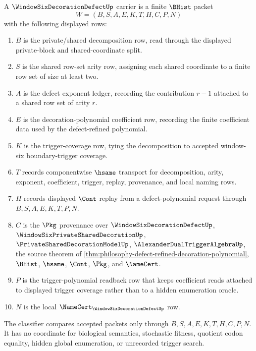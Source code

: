 \begin{definition}\label{def:window-six-decoration-defect-carrier}
A $\WindowSixDecorationDefectUp$ carrier is a finite $\BHist$ packet
$$
W=(B,S,A,E,K,T,H,C,P,N)
$$
with the following displayed rows:
\begin{enumerate}
\item $B$ is the private/shared decomposition row, read through the displayed private-block and shared-coordinate split.
\item $S$ is the shared row-set arity row, assigning each shared coordinate to a finite row set of size at least two.
\item $A$ is the defect exponent ledger, recording the contribution $r-1$ attached to a shared row set of arity $r$.
\item $E$ is the decoration-polynomial coefficient row, recording the finite coefficient data used by the defect-refined polynomial.
\item $K$ is the trigger-coverage row, tying the decomposition to accepted window-six boundary-trigger coverage.
\item $T$ records componentwise $\hsame$ transport for decomposition, arity, exponent, coefficient, trigger, replay, provenance, and local naming rows.
\item $H$ records displayed $\Cont$ replay from a defect-polynomial request through $B,S,A,E,K,T,P,N$.
\item $C$ is the $\Pkg$ provenance over $\WindowSixDecorationDefectUp$, $\WindowSixPrivateSharedDecorationUp$, $\PrivateSharedDecorationModelUp$, $\AlexanderDualTriggerAlgebraUp$, the source theorem of \autoref{thm:philosophy-defect-refined-decoration-polynomial}, $\BHist$, $\hsame$, $\Cont$, $\Pkg$, and $\NameCert$.
\item $P$ is the trigger-polynomial readback row that keeps coefficient reads attached to displayed trigger coverage rather than to a hidden enumeration oracle.
\item $N$ is the local $\NameCert_{\WindowSixDecorationDefectUp}$ row.
\end{enumerate}
The classifier compares accepted packets only through $B,S,A,E,K,T,H,C,P,N$. It has no coordinate for biological semantics, stochastic fitness, quotient codon equality, hidden global enumeration, or unrecorded trigger search.
\end{definition}

